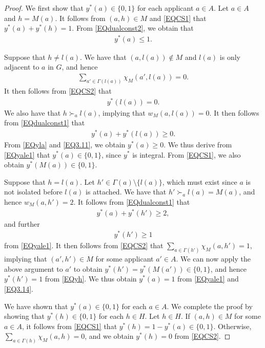 \documentclass[11pt,a4paper,showkeys]{article}
\theoremstyle{plain}
\theoremstyle{definition}
\begin{document}
\begin{proof}
    We first show that $y^*(a)\in \{0,1\}$ for each applicant $a\in A$. 
    Let $a\in A$ and $h=M(a)$. 
    It follows from $(a,h)\in M$ and \eqref{EQCS1} that $y^*(a)+y^*(h)=1$. 
    From \eqref{EQdualconst2}, we obtain that 
    \begin{align}
        \label{EQyale1}
        y^*(a)\leq 1. 
    \end{align} 

    Suppose that $h\neq l(a)$. 
    We have that $(a,l(a)) \not\in M$ and $l(a)$ is only adjacent to $a$ in $G$, 
    and hence 
    \begin{align*}
        \sum_{a'\in \Gamma(l(a))}\chi_M(a',l(a))= 0. 
    \end{align*}
    It then follows from \eqref{EQCS2} that 
    \begin{align}
    \label{EQyla}
        y^*(l(a))=0. 
    \end{align}
    We also have that 
    $h \succ_a l(a)$, 
    implying that $w_M(a,l(a))=0$. 
    It then follows from \eqref{EQdualconst1} that 
    \begin{align}
        \label{EQ3.11}
        y^*(a) + y^*(l(a)) \ge 0.
    \end{align}
    From \eqref{EQyla} and \eqref{EQ3.11}, 
    we obtain $y^*(a)\ge 0$. 
    We thus derive from \eqref{EQyale1} 
    that 
    $y^*(a)\in \{0,1\}$, 
    since $y^*$ is integral. 
    From \eqref{EQCS1}, 
    we also obtain $y^*(M(a)) \in \{0,1\}$. 

    Suppose that $h=l(a)$. 
    Let $h'\in \Gamma(a) \setminus \{l(a)\}$, 
    which must exist since $a$ is not isolated before $l(a)$ is attached. 
    We have that $h' \succ_a l(a)=M(a)$, and hence $w_M(a,h')=2$. 
    It follows from \eqref{EQdualconst1} that 
    \begin{align}
        \label{EQ3.14}
        y^*(a) + y^*(h')\ge 2, 
    \end{align}
    and further 
    \begin{align}
        \label{EQyh}
        y^*(h')\ge 1
    \end{align} from \eqref{EQyale1}. 
    It then follows from \eqref{EQCS2} that $\sum_{a\in \Gamma(h')}\chi_M(a,h')= 1$, 
    implying that $(a',h')\in M$ for some applicant $a'\in A$. 
    We can now apply the above argument to $a'$ to obtain $y^*(h')=y^*(M(a'))\in \{0,1\}$, 
    and hence $y^*(h')= 1$ from \eqref{EQyh}. 
    We thus obtain $y^*(a)= 1$ from \eqref{EQyale1} and \eqref{EQ3.14}. 

    We have shown that $y^*(a)\in \{0,1\}$ for each $a\in A$. 
    We complete the proof by showing that $y^*(h)\in \{0,1\}$ for each $h\in H$. 
    Let $h\in H$. 
    If $(a,h)\in M$ for some $a\in A$, 
    it follows from \eqref{EQCS1} that $y^*(h)=1-y^*(a)\in \{0,1\}$. 
    Otherwise, 
    $\sum_{a\in \Gamma(h)}\chi_M(a,h)= 0$, 
    and 
    we obtain $y^*(h)=0$ from \eqref{EQCS2}. 
\end{proof}
\end{document}
